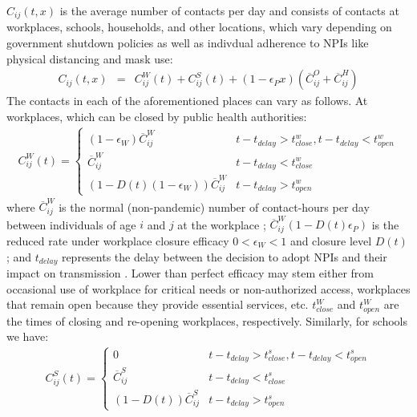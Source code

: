 $C_{ij}(t,x)$ is the average number of contacts per day and consists of contacts at workplaces, schools, households, and other locations, which vary depending on government shutdown policies as well as indivdual adherence to NPIs like physical distancing and mask use: 
\begin{eqnarray}
C_{ij}(t,x) &= & C^W_{ij}(t) + C^S_{ij}(t) + (1 - \epsilon_P x ) (\overline{C}^O_{ij} + \overline{C}^H_{ij} )
\end{eqnarray}
The contacts in each of the aforementioned places can vary as follows. At workplaces, which can be closed by public health authorities: 
\begin{eqnarray}
C^W_{ij}(t) =  \left\{
\begin{array}{ll}
      (1 - \epsilon_W) \overline{C}^W_{ij} & t - t_{delay} >t^w_{close}, t  - t_{delay}< t^w_{open} \\ 
      \overline{C}^W_{ij} &  t - t_{delay}<t^w_{close} \\
       
       (1 - D(t)(1 - \epsilon_W)) \overline{C}^W_{ij} & t - t_{delay}> t^w_{open}
\end{array} 
\label{cw_eqn}
\right. 
\end{eqnarray}
where $\overline{C}^W_{ij}$ is the normal (non-pandemic) number of contact-hours per day between individuals of age $i$ and $j$ at the workplace \cite{zagheni2008using}; $\overline{C}^W_{ij} (1 - D(t)\epsilon_P)$ is the reduced rate under workplace closure efficacy $0 < \epsilon_W< 1$ and closure level $D(t)$; and $t_{delay}$ represents the delay between the decision to adopt NPIs and their impact on transmission \cite{li2020temporal}. Lower than perfect efficacy may stem either from occasional use of workplace for critical needs or non-authorized access, workplaces that remain open because they provide essential services, etc. $t^W_{close}$ and $t^W_{open}$ are the times of closing and re-opening workplaces, respectively. Similarly, for schools we have: 
\begin{eqnarray}
  C^S_{ij}(t) =  \left\{
\begin{array}{ll}
      0 & t - t_{delay}>t^s_{close}, t - t_{delay} < t^s_{open} \\ 
      \overline{C}^S_{ij} &  t - t_{delay}<t^s_{close} \\
       
      (1 - D(t)) \overline{C}^S_{ij} & t - t_{delay} > t^s_{open}
\end{array} 
\right. 
\label{cs_eqn}
\end{eqnarray}
